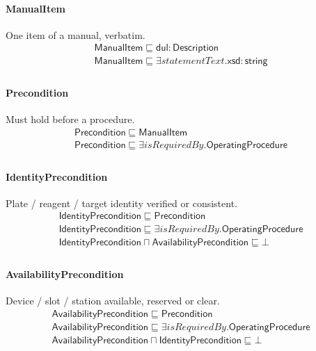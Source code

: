 \documentclass[10pt]{article}
\begin{document}
\paragraph{ManualItem} One item of a manual, verbatim.
\[\begin{array}{l}
\mathsf{ManualItem} \sqsubseteq  \mathsf{dul{:}Description} \\
\mathsf{ManualItem} \sqsubseteq  \exists \mathit{statementText}.\mathsf{xsd{:}string} \\
\end{array}\]
\paragraph{Precondition} Must hold before a procedure.
\[\begin{array}{l}
\mathsf{Precondition} \sqsubseteq  \mathsf{ManualItem} \\
\mathsf{Precondition} \sqsubseteq  \exists \mathit{isRequiredBy}.\mathsf{OperatingProcedure} \\
\end{array}\]
\paragraph{IdentityPrecondition} Plate / reagent / target identity verified or consistent.
\[\begin{array}{l}
\mathsf{IdentityPrecondition} \sqsubseteq  \mathsf{Precondition} \\
\mathsf{IdentityPrecondition} \sqsubseteq  \exists \mathit{isRequiredBy}.\mathsf{OperatingProcedure} \\
\mathsf{IdentityPrecondition} \sqcap  \mathsf{AvailabilityPrecondition} \sqsubseteq  \bot  \\
\end{array}\]
\paragraph{AvailabilityPrecondition} Device / slot / station available, reserved or clear.
\[\begin{array}{l}
\mathsf{AvailabilityPrecondition} \sqsubseteq  \mathsf{Precondition} \\
\mathsf{AvailabilityPrecondition} \sqsubseteq  \exists \mathit{isRequiredBy}.\mathsf{OperatingProcedure} \\
\mathsf{AvailabilityPrecondition} \sqcap  \mathsf{IdentityPrecondition} \sqsubseteq  \bot  \\
\end{array}\]
\end{document}
